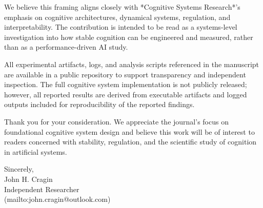 We believe this framing aligns closely with *Cognitive Systems Research*'s emphasis on cognitive architectures, dynamical systems, regulation, and interpretability. The contribution is intended to be read as a systems-level investigation into how stable cognition can be engineered and measured, rather than as a performance-driven AI study.

All experimental artifacts, logs, and analysis scripts referenced in the manuscript are available in a public repository to support transparency and independent inspection. The full cognitive system implementation is not publicly released; however, all reported results are derived from executable artifacts and logged outputs included for reproducibility of the reported findings.

Thank you for your consideration. We appreciate the journal's focus on foundational cognitive system design and believe this work will be of interest to readers concerned with stability, regulation, and the scientific study of cognition in artificial systems.

Sincerely,\\
John H. Cragin\\
Independent Researcher\\
[john.cragin@outlook.com](mailto:john.cragin@outlook.com)